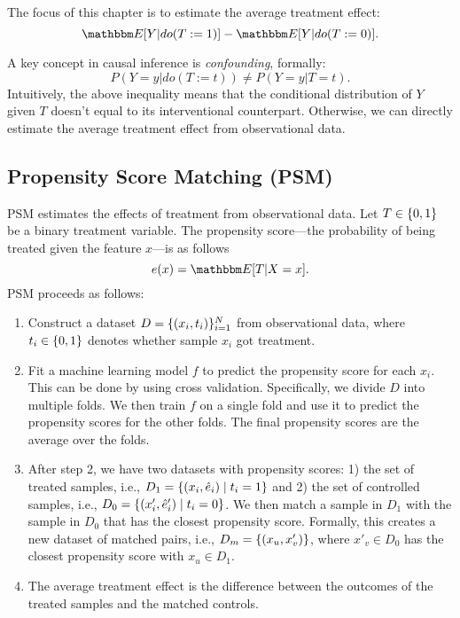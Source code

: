 

The focus of this chapter is to estimate the average treatment effect:
    \begin{equation}
        \E[Y | do( T:= 1)] - \E[Y | do( T:= 0)].
    \end{equation}

A key concept in causal inference is \emph{confounding}, formally:
    \begin{equation}
        P(Y=y | do(T:=t)) \ne P(Y=y | T=t).
    \end{equation}
Intuitively, the above inequality means that the conditional distribution of $Y$ given $T$ doesn't equal to its interventional counterpart. Otherwise, we can directly estimate the average treatment effect from observational data.

\subsection{Propensity Score Matching (PSM)}
    PSM estimates the effects of treatment from observational data.
    Let $T \in \{ 0, 1 \}$ be a binary treatment variable.
    The propensity score---the probability of being treated given the feature $x$---is as follows
        \begin{equation}
            e(x) = \E[T | X = x].
        \end{equation}
    PSM proceeds as follows:
        \begin{enumerate}
            \item Construct a dataset $D = \{ (x_i, t_i) \}_{i=1}^{N}$ from observational data, where $t_i \in \{ 0, 1 \}$ denotes whether sample $x_i$ got treatment.
            \item Fit a machine learning model $f$ to predict the propensity score for each $x_i$. This can be done by using cross validation. Specifically, we divide $D$ into multiple folds. We then train $f$ on a single fold and use it to predict the propensity scores for the other folds. 
            The final propensity scores are the average over the folds. 
            
            \item After step 2, we have two datasets with propensity scores: 1) the set of treated samples, i.e., $D_1 = \{ (x_i, \hat{e}_i) \mid t_i=1 \}$ and 2) the set of controlled samples, i.e., $D_0 = \{ (x'_i, \hat{e}'_i) \mid t_i=0 \}$.
            We then match a sample in $D_1$ with the sample in $D_0$ that has the closest propensity score.
            Formally, this creates a new dataset of matched pairs, i.e., $D_m = \{ (x_u, x'_v) \}$, where $x'_v \in D_0$ has the closest propensity score with $x_u \in D_1$.
            
            \item The average treatment effect is the difference between the outcomes of the treated samples and the matched controls.
        \end{enumerate}
        

